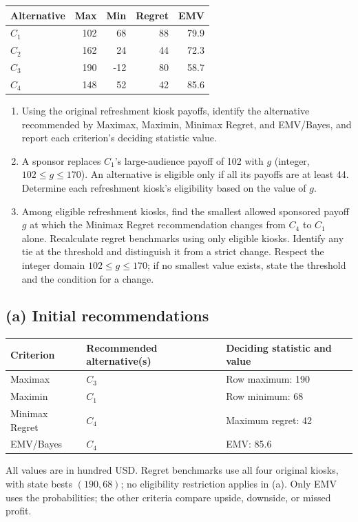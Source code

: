 \begin{center}\small\setlength{\tabcolsep}{4pt}
	\begin{tabular}{lrrrr}\toprule
		Alternative & Max & Min & Regret & EMV\\ \midrule
				$C_1$ & 102 & 68 & 88 & 79.9\\
		$C_2$ & 162 & 24 & 44 & 72.3\\
		$C_3$ & 190 & -12 & 80 & 58.7\\
		$C_4$ & 148 & 52 & 42 & 85.6\\
		\bottomrule
	\end{tabular}
\end{center}

\begin{enumerate}[label=\textbf{(\alph*)},leftmargin=*]
	\item Using the original refreshment kiosk payoffs, identify the alternative recommended by Maximax, Maximin, Minimax Regret, and EMV/Bayes, and report each criterion's deciding statistic value. 

	\item A sponsor replaces $C_1$'s large-audience payoff of 102 with $g$ (integer, $102\leq g\leq170$). An alternative is eligible only if all its payoffs are at least 44. Determine each refreshment kiosk's eligibility based on the value of $g$. 

	\item Among eligible refreshment kiosks, find the smallest allowed sponsored payoff $g$ at which the Minimax Regret recommendation changes from $C_4$ to $C_1$ alone. Recalculate regret benchmarks using only eligible kiosks. Identify any tie at the threshold and distinguish it from a strict change. Respect the integer domain $102\leq g\leq170$; if no smallest value exists, state the threshold and the condition for a change. 
\end{enumerate}
\label{sol:q2a}
\subsection*{(a) Initial recommendations }
\begin{center}
\begin{tabular}{lll}\toprule
Criterion & Recommended alternative(s) & Deciding statistic and value\\ \midrule
		Maximax & $C_3$ & Row maximum: 190\\
		Maximin & $C_1$ & Row minimum: 68\\
		Minimax Regret & $C_4$ & Maximum regret: 42\\
		EMV/Bayes & $C_4$ & EMV: 85.6\\
		\bottomrule\end{tabular}
\end{center}
All values are in hundred USD. Regret benchmarks use all four original kiosks, with state bests $(190,68)$; no eligibility restriction applies in (a). Only EMV uses the probabilities; the other criteria compare upside, downside, or missed profit.
\secInicio[sec:q2]



